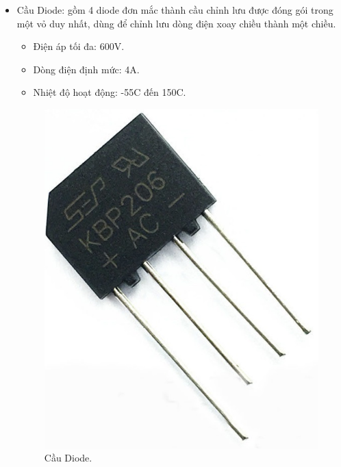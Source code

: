 \documentclass[a4paper,12pt,oneside]{article}
\begin{document}
\begin{itemize}
\item	Cầu Diode: gồm 4 diode đơn mắc thành cầu chỉnh lưu được đóng gói trong một vỏ duy nhất, dùng để chỉnh lưu dòng điện xoay chiều thành một chiều.
	\begin{itemize}
	\item	Điện áp tối đa: 600V.
	\item	Dòng điện định mức: 4A.
	\item	Nhiệt độ hoạt động: -55\textdegree{}C đến 150\textdegree{}C.
	\end{itemize}
\begin{figure}[H]
\centering
\begin{center}
\includegraphics[scale=.3]{hinh/PPM/ppm_caudiode.jpg}
\end{center}
\caption{Cầu Diode.}
\end{figure}
\end{itemize}
\end{document}
